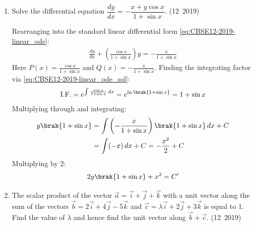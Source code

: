 \begin{enumerate}[label=\thesubsection.\arabic*, ref=\thesubsection.\theenumi]
\item Solve the differential equation $\dfrac{dy}{dx} = -\dfrac{x + y\cos x}{1 + \sin x}$.
\hfill (12~2019)

\solution
Rearranging into the standard linear differential form \eqref{eq:CBSE12-2019-linear_ode}:
\begin{align}
	\frac{dy}{dx} + \left(\frac{\cos x}{1 + \sin x}\right)y = -\frac{x}{1 + \sin x}
\end{align}
Here $P(x) = \frac{\cos x}{1 + \sin x}$ and $Q(x) = -\frac{x}{1 + \sin x}$.
Finding the integrating factor via \eqref{eq:CBSE12-2019-linear_ode_sol}:
\begin{align}
	\text{I.F.} = e^{\int \frac{\cos x}{1 + \sin x}\,dx} = e^{\ln\brak{1 + \sin x}} = 1 + \sin x
\end{align}
Multiplying through and integrating:
\begin{align}
	y\brak{1 + \sin x} &= \int \left(-\frac{x}{1 + \sin x}\right)\brak{1 + \sin x}\,dx + C \\
	&= \int (-x)\,dx + C = -\frac{x^2}{2} + C
\end{align}
Multiplying by $2$:
\begin{align}
	2y\brak{1 + \sin x} + x^2 = C'
\end{align}



\item The scalar product of the vector $\vec{a} = \vec{i} + \vec{j} + \vec{k}$ with a unit vector along the sum of the vectors $\vec{b} = 2\vec{i} + 4\vec{j} - 5\vec{k}$ and $\vec{c} = \lambda\vec{i} + 2\vec{j} + 3\vec{k}$ is equal to $1$. Find the value of $\lambda$ and hence find the unit vector along $\vec{b} + \vec{c}$.
\hfill (12~2019)


\end{enumerate}
